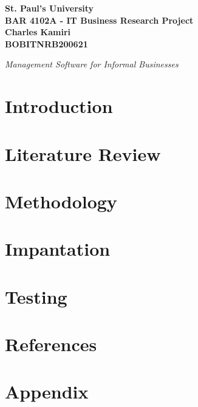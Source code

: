 \documentclass{article}
\begin{document}
\begin{center}
	{\bfseries\huge
		St. Paul's University \\
		BAR 4102A - IT Business Research Project \\
		Charles Kamiri  \\
		BOBITNRB200621 \\ [60pt]
	}

\emph{Management Software for Informal Businesses}
\end{center}
\newpage
\pagestyle{fancy}


\section*{Introduction}
\lipsum[1-2]
\newpage


\section*{Literature Review}
\lipsum[1-2]
\newpage


\section*{Methodology}
\lipsum[1-2]
\newpage


\section*{Impantation}
\lipsum[1-2]
\newpage


\section*{Testing}
\lipsum[1-2]
\newpage


\section*{References}
\lipsum[1-2]
\newpage


\section{Appendix}
\lipsum[1-2]
\newpage
\end{document}
